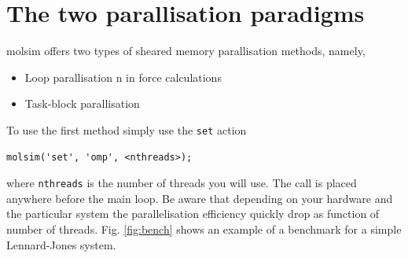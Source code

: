\documentclass[11pt]{article}
\begin{document}
\section{The two parallisation paradigms}
\textsf{molsim} offers two types of sheared memory parallisation methods,
namely,  
\begin{itemize}
\item Loop parallisation n in force calculations
\item Task-block parallisation
\end{itemize}
To use the first method simply use the \verb!set! action
\begin{verbatim}
molsim('set', 'omp', <nthreads>);
\end{verbatim}
where \verb!nthreads! is the number of threads you will use. The call is placed
anywhere before the main loop. Be aware that depending on your hardware and the
particular system the parallelisation efficiency quickly drop as function of
number of threads. Fig. \ref{fig:bench} shows an example of a benchmark for a
simple Lennard-Jones system.  


\appendix
\end{document}
